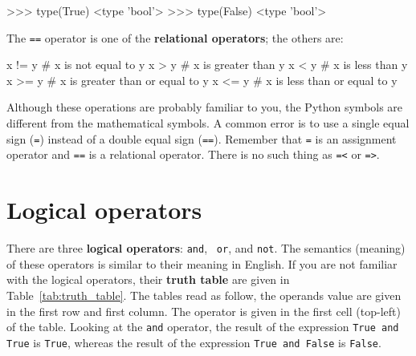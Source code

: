 \beforeverb
\begin{pyinterpreter}
>>> type(True)
<type 'bool'>
>>> type(False)
<type 'bool'>
\end{pyinterpreter}
\afterverb
%
The {\tt ==} operator is one of the {\bf relational operators}; the
others are:

\beforeverb
\begin{pycode}
x != y               # x is not equal to y
x > y                # x is greater than y
x < y                # x is less than y
x >= y               # x is greater than or equal to y
x <= y               # x is less than or equal to y
\end{pycode}
\afterverb
%
Although these operations are probably familiar to you, the Python
symbols are different from the mathematical symbols.  A common error
is to use a single equal sign ({\tt =}) instead of a double equal sign
({\tt ==}).  Remember that {\tt =} is an assignment operator and
{\tt ==} is a relational operator.   There is no such thing as
{\tt =<} or {\tt =>}.



\section {Logical operators}
\label{sec:logical-operators}

There are three {\bf logical operators}: {\tt and}, {\tt
or}, and {\tt not}.  The semantics (meaning) of these operators is
similar to their meaning in English. If you are not familiar with the logical operators, their {\bf truth table} are given in Table~\ref{tab:truth_table}. The tables read as follow, the operands value are given in the first row and first column. The operator is given in the first cell (top-left) of the table. Looking at the {\tt and} operator, the result of the expression {\tt True and True} is {\tt True}, whereas the result of the expression {\tt True and False} is {\tt False}.

